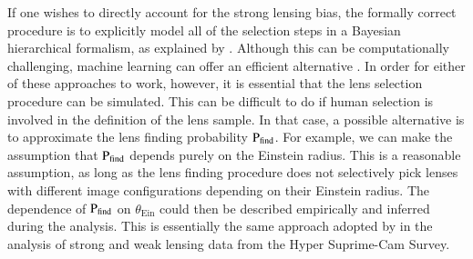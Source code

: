 \documentclass{aa}
\def\tein{\theta_{\mathrm{Ein}}}
\def\pdet{{\rm P}_\mathrm{det}}
\def\psel{{\rm P}_\mathrm{sel}}
\def\pfind{{\rm P}_\mathrm{find}}
\begin{document}
If one wishes to directly account for the strong lensing bias, the formally correct procedure is to explicitly model all of the selection steps in a Bayesian hierarchical formalism, as explained by \citet{Son22}.
Although this can be computationally challenging, machine learning can offer an efficient alternative \citep{Leg++22}.
In order for either of these approaches to work, however, it is essential that the lens selection procedure can be simulated.
This can be difficult to do if human selection is involved in the definition of the lens sample.
In that case, a possible alternative is to approximate the lens finding probability $\pfind$. %
For example, we can make the assumption that $\pfind$ depends purely on the Einstein radius.
This is a reasonable assumption, as long as the lens finding procedure does not selectively pick lenses with different image configurations depending on their Einstein radius.
The dependence of $\pfind$ on $\tein$ could then be described empirically and inferred during the analysis.
This is essentially the same approach adopted by \citet{Son++19} in the analysis of strong and weak lensing data from the Hyper Suprime-Cam Survey.


\end{document}
